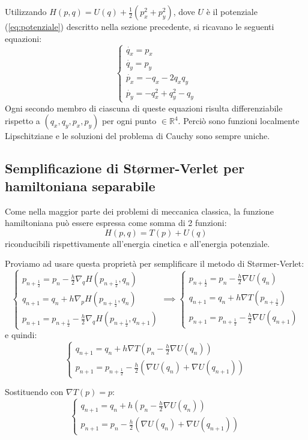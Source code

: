 \documentclass[a4paper, 12pt]{article}
\numberwithin{equation}{section}
\numberwithin{figure}{section}
\begin{document}
Utilizzando $H(p,q) = U(q)+\frac{1}{2}(p_x^2+p_y^2)$, dove $U$ è il potenziale (\ref{eq:potenziale})
descritto nella sezione precedente, si ricavano le
seguenti equazioni:
$$
\begin{cases}
	\dot{q_x} = p_x\\
	\dot{q_y} = p_y\\
	\dot{p_x} = -q_x-2q_x q_y\\
	\dot{p_y} = -q_x^2 + q_y^2 - q_y
\end{cases}
$$
Ogni secondo membro di ciascuna di queste equazioni risulta differenziabile rispetto a
$(q_x,q_y,p_x,p_y)$ per ogni punto $\in \mathbb{R}^4$. Perciò sono funzioni localmente
Lipschitziane e le soluzioni del problema di Cauchy sono sempre uniche.

\subsection{Semplificazione di Størmer-Verlet per hamiltoniana separabile}
Come nella maggior parte dei problemi di meccanica classica, la funzione hamiltoniana
può essere espressa come somma di 2 funzioni:
\begin{equation}
	H(p,q) = T(p) + U(q)
\end{equation}
riconducibili rispettivamente all'energia cinetica e all'energia potenziale.

Proviamo ad usare questa proprietà per semplificare il metodo di Størmer-Verlet:
$$
\begin{cases}
	p_{n+\frac{1}{2}} = p_n - \frac{h}{2}\nabla_q H(p_{n+\frac{1}{2}},q_n)\\
	q_{n+1} = q_n + h \nabla_p H(p_{n+\frac{1}{2}}, q_n)\\
	p_{n+1} = p_{n+\frac{1}{2}} - \frac{h}{2} \nabla_q H(p_{n+\frac{1}{2}},q_{n+1})
\end{cases}
\implies
\begin{cases}
	p_{n+\frac{1}{2}} = p_n - \frac{h}{2}\nabla U(q_n)\\
	q_{n+1} = q_n + h \nabla T(p_{n+\frac{1}{2}})\\
	p_{n+1} = p_{n+\frac{1}{2}} - \frac{h}{2} \nabla U(q_{n+1})
\end{cases}
$$
e quindi:
$$
\begin{cases}
	q_{n+1} = q_n + h \nabla T(p_n - \frac{h}{2}\nabla U(q_n))\\
	p_{n+1} = p_{n+\frac{1}{2}} - \frac{h}{2} (\nabla U(q_n)+\nabla U(q_{n+1}))
\end{cases}
$$

Sostituendo con $\nabla T(p)=p$:
$$
\begin{cases}
	q_{n+1} = q_n + h(p_n-\frac{h}{2}\nabla U(q_n))\\
	p_{n+1} = p_n - \frac{h}{2} (\nabla U(q_n)+\nabla U(q_{n+1}))
\end{cases}
$$
\end{document}
